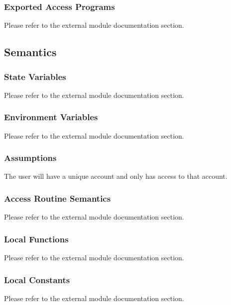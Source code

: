 \documentclass[12pt, titlepage]{article}
\begin{document}
\subsubsection{Exported Access Programs}

Please refer to the external module documentation section.

\subsection{Semantics}

\subsubsection{State Variables}

Please refer to the external module documentation section.

\subsubsection{Environment Variables}

Please refer to the external module documentation section.

\subsubsection{Assumptions}

The user will have a unique account and only has access to that account.

\subsubsection{Access Routine Semantics}

Please refer to the external module documentation section.

\subsubsection{Local Functions}

Please refer to the external module documentation section.

\subsubsection{Local Constants}

Please refer to the external module documentation section.

\newpage
\end{document}
